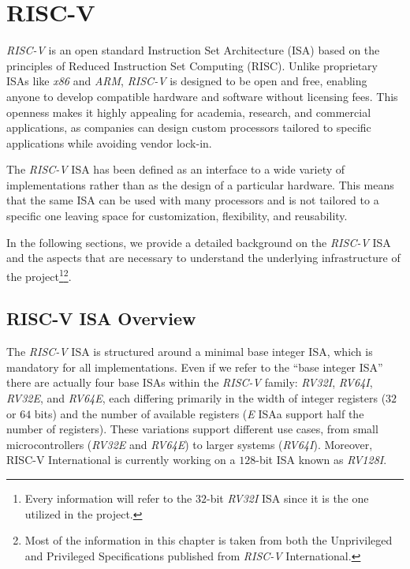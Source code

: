 \chapter{RISC-V}
\label{cha:riscv}

\textit{RISC-V} is an open standard Instruction Set Architecture (ISA) based on the
principles of Reduced Instruction Set Computing (RISC). Unlike proprietary ISAs
like \textit{x86} and \textit{ARM}, \textit{RISC-V} is designed to be open and
free, enabling anyone to develop compatible hardware and software without licensing
fees. This openness makes it highly appealing for academia, research, and
commercial applications, as companies can design custom processors tailored to specific
applications while avoiding vendor lock-in.

The \textit{RISC-V} ISA has been defined as an interface to a wide variety of
implementations rather than as the design of a particular hardware. This means that
the same ISA can be used with many processors and is not tailored to a specific one
leaving space for customization, flexibility, and reusability.

In the following sections, we provide a detailed background on the \textit{RISC-V}
ISA and the aspects that are necessary to understand the underlying infrastructure
of the project\footnote{Every information will refer to the $32$-bit \textit{RV32I}
ISA since it is the one utilized in the project.}\footnote{Most of the
information in this chapter is taken from both the Unprivileged and Privileged
Specifications\cite{specifications} published from \textit{RISC-V} International.}.

\section{RISC-V ISA Overview}
\label{sec:riscv_isa}

The \textit{RISC-V} ISA is structured around a minimal base integer ISA, which
is mandatory for all implementations. Even if we refer to the ``base integer ISA''
there are actually four base ISAs within the \textit{RISC-V} family: \textit{RV32I},
\textit{RV64I}, \textit{RV32E}, and \textit{RV64E}, each differing primarily in the
width of integer registers ($32$ or $64$ bits) and the number of available registers
(\textit{E} ISAa support half the number of registers). These variations support
different use cases, from small microcontrollers (\textit{RV32E} and \textit{RV64E})
to larger systems (\textit{RV64I}). Moreover, RISC-V International is currently working
on a $128$-bit ISA known as \textit{RV128I}.

